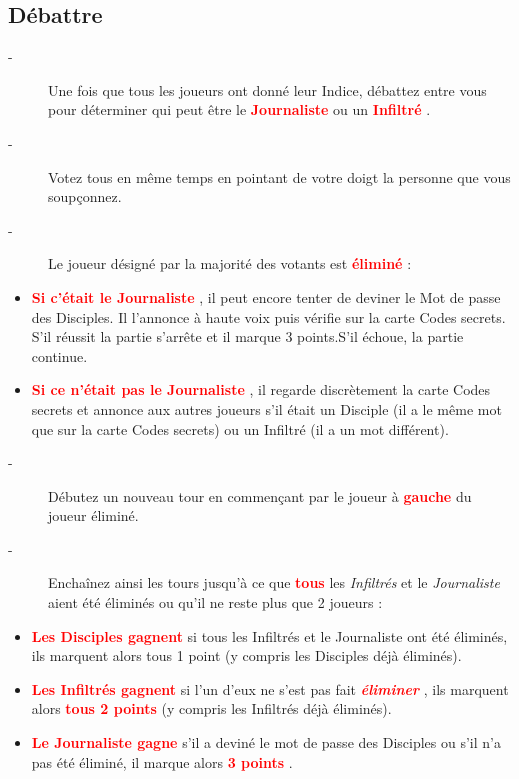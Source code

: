 \documentclass{article}%
\begin{document}
\subsection{ Débattre
}%
\label{subsec:Dbattre}%
\begin{description}%
\item[{-} ]%
%
 Une fois que tous les joueurs ont donné leur Indice, débattez entre vous pour déterminer qui peut être le %
\textcolor{red}{%
\textbf{Journaliste}%
}%
\textit{ }%
 ou un %
\textcolor{red}{%
\textbf{Infiltré}%
}%
.
%
\item[{-} ]%
%
 Votez tous en même temps en pointant de votre doigt la personne que vous soupçonnez.
%
\item[{-} ]%
%
 Le joueur désigné par la majorité des votants est %
\textcolor{red}{%
\textbf{éliminé}%
}%
\textit{ }%
 :
%
\end{description}%
\begin{itemize}%
\item%
%
\textcolor{red}{%
\textbf{Si c’était le Journaliste}%
}%
, il peut encore tenter de deviner le Mot de passe des Disciples. Il l'annonce à haute voix puis vérifie sur la carte Codes secrets. S’il réussit la partie s’arrête et il marque 3 points.S’il échoue, la partie continue.
%
\item%
%
\textcolor{red}{%
\textbf{Si ce n’était pas le Journaliste}%
}%
, il regarde discrètement la carte Codes secrets et annonce aux autres joueurs s’il était un Disciple (il a le même mot que sur la carte Codes secrets) ou un Infiltré (il a un mot différent).
%
\end{itemize}%
\begin{description}%
\item[{-} ]%
%
 Débutez un nouveau tour en commençant par le joueur à %
\textcolor{red}{%
\textbf{gauche}%
}%
\textit{ }%
 du joueur éliminé.
%
\item[{-} ]%
%
 Enchaînez ainsi les tours jusqu’à ce que %
\textcolor{red}{%
\textbf{tous}%
}%
\textit{ }%
 les %
\textit{Infiltrés}%
\textit{ }%
 et le %
\textit{Journaliste}%
\textit{ }%
 aient été éliminés ou qu’il ne reste plus que 2 joueurs :
%
\end{description}%
\begin{itemize}%
\item%
%
\textcolor{red}{%
\textbf{Les Disciples gagnent}%
}%
\textit{ }%
 si tous les Infiltrés et le Journaliste ont été éliminés, ils marquent alors tous 1 point (y compris les Disciples déjà éliminés).
%
\item%
%
\textcolor{red}{%
\textbf{Les Infiltrés gagnent}%
}%
\textit{ }%
 si l'un d'eux ne s'est pas fait %
\textcolor{red}{\textbf{\textit{éliminer}}}%
\textit{ }%
 , ils marquent alors %
\textcolor{red}{%
\textbf{tous 2 points}%
}%
\textit{ }%
 (y compris les Infiltrés déjà éliminés).
%
\item%
%
\textcolor{red}{%
\textbf{Le Journaliste gagne}%
}%
\textit{ }%
 s'il a deviné le mot de passe des Disciples ou s'il n'a pas été éliminé, il marque alors %
\textcolor{red}{%
\textbf{3 points}%
}%
.
%
\end{itemize}%
\end{document}
